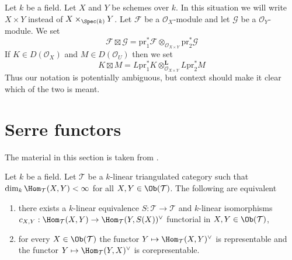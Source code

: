 \medskip\noindent
Let $k$ be a field. Let $X$ and $Y$ be schemes over $k$. In this
situation we will write $X \times Y$ instead of $X \times_{\Spec(k)} Y$.
Let $\mathcal{F}$ be a $\mathcal{O}_X$-module and let
$\mathcal{G}$ be a $\mathcal{O}_Y$-module. We set
$$
\mathcal{F} \boxtimes \mathcal{G} =
\text{pr}_1^*\mathcal{F} \otimes_{\mathcal{O}_{X \times Y}}
\text{pr}_2^*\mathcal{G}
$$
If $K \in D(\mathcal{O}_X)$ and $M \in D(\mathcal{O}_U)$ then we set
$$
K \boxtimes M =
L\text{pr}_1^*K \otimes_{\mathcal{O}_{X \times Y}}^\mathbf{L} L\text{pr}_2^*M
$$
Thus our notation is potentially ambiguous, but context should make it clear
which of the two is meant.





\section{Serre functors}
\label{section-Serre-functors}

\noindent
The material in this section is taken from \cite{Bondal-Kapranov}.

\begin{lemma}
\label{lemma-Serre-functor-exists}
Let $k$ be a field. Let $\mathcal{T}$ be a $k$-linear
triangulated category such that $\dim_k \Hom_\mathcal{T}(X, Y) < \infty$
for all $X, Y \in \Ob(\mathcal{T})$. The following are equivalent
\begin{enumerate}
\item there exists a $k$-linear equivalence
$S : \mathcal{T} \to \mathcal{T}$ and $k$-linear isomorphisms
$c_{X, Y} : \Hom_\mathcal{T}(X, Y) \to \Hom_\mathcal{T}(Y, S(X))^\vee$
functorial in $X, Y \in \Ob(\mathcal{T})$,
\item for every $X \in \Ob(\mathcal{T})$
the functor $Y \mapsto \Hom_\mathcal{T}(X, Y)^\vee$
is representable and the functor $Y \mapsto \Hom_\mathcal{T}(Y, X)^\vee$
is corepresentable.
\end{enumerate}
\end{lemma}

